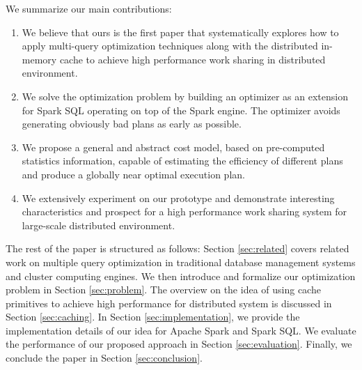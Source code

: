 We summarize our main contributions:
\begin{enumerate}
	\item We believe that ours is the first paper that systematically explores how to apply multi-query optimization techniques along with the distributed in-memory cache to achieve high performance work sharing in distributed environment.
	\item We solve the optimization problem by building an optimizer as an extension for Spark SQL operating on top of the Spark engine. The optimizer avoids generating obviously bad plans as early as possible.
	\item We propose a general and abstract cost model, based on pre-computed statistics information, capable of estimating the efficiency of different plans and produce a globally near optimal execution plan.
	\item We extensively experiment on our prototype and demonstrate interesting characteristics and prospect for a high performance work sharing system for large-scale distributed environment.
\end{enumerate}

The rest of the paper is structured as follows:  Section \ref{sec:related} covers related work on multiple query optimization in traditional database management systems and cluster computing engines. We then introduce and formalize our optimization problem in Section \ref{sec:problem}. The overview on the idea of using cache primitives to achieve high performance for distributed system is discussed in Section \ref{sec:caching}. In Section \ref{sec:implementation}, we provide the implementation details of our idea for Apache Spark and Spark SQL. We evaluate the performance of our proposed approach in Section \ref{sec:evaluation}. Finally, we conclude the paper in Section \ref{sec:conclusion}.